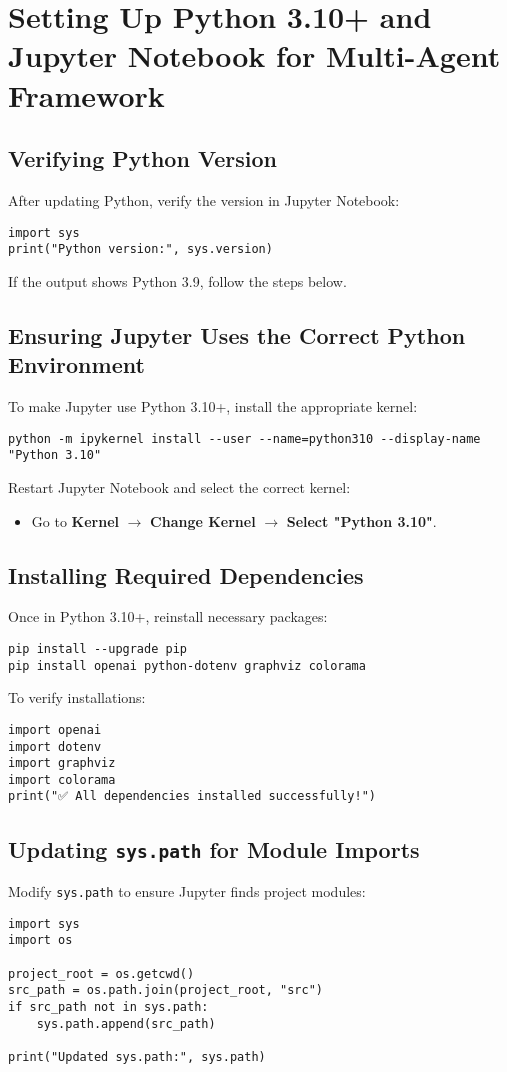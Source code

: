 \section{Setting Up Python 3.10+ and Jupyter Notebook for Multi-Agent Framework}


\subsection{Verifying Python Version}
After updating Python, verify the version in Jupyter Notebook:
\begin{verbatim}
import sys
print("Python version:", sys.version)
\end{verbatim}
If the output shows Python 3.9, follow the steps below.

\subsection{Ensuring Jupyter Uses the Correct Python Environment}
To make Jupyter use Python 3.10+, install the appropriate kernel:
\begin{verbatim}
python -m ipykernel install --user --name=python310 --display-name "Python 3.10"
\end{verbatim}
Restart Jupyter Notebook and select the correct kernel:
\begin{itemize}
    \item Go to \textbf{Kernel} $\rightarrow$ \textbf{Change Kernel} $\rightarrow$ \textbf{Select "Python 3.10"}.
\end{itemize}

\subsection{Installing Required Dependencies}
Once in Python 3.10+, reinstall necessary packages:
\begin{verbatim}
pip install --upgrade pip
pip install openai python-dotenv graphviz colorama
\end{verbatim}
To verify installations:
\begin{verbatim}
import openai
import dotenv
import graphviz
import colorama
print("✅ All dependencies installed successfully!")
\end{verbatim}

\subsection{Updating \texttt{sys.path} for Module Imports}
Modify \texttt{sys.path} to ensure Jupyter finds project modules:
\begin{verbatim}
import sys
import os

project_root = os.getcwd()
src_path = os.path.join(project_root, "src")
if src_path not in sys.path:
    sys.path.append(src_path)

print("Updated sys.path:", sys.path)
\end{verbatim}

